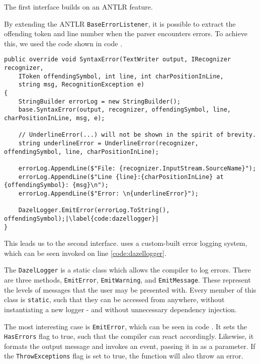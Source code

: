 The first interface builds on an ANTLR feature. 

By extending the ANTLR \texttt{BaseErrorListener}, it is possible to extract the offending token and line number when the parser encounters errors. To achieve this, we used the code shown in code .

\begin{lstlisting}[language=CSharp, caption={The altered \texttt{SyntaxError} method.}, label={lst:SyntaxErrorCode}, escapechar=|]
public override void SyntaxError(TextWriter output, IRecognizer recognizer, 
    IToken offendingSymbol, int line, int charPositionInLine,
    string msg, RecognitionException e)
{
    StringBuilder errorLog = new StringBuilder();
    base.SyntaxError(output, recognizer, offendingSymbol, line, charPositionInLine, msg, e);
    
    // UnderlineError(...) will not be shown in the spirit of brevity.
    string underlineError = UnderlineError(recognizer, offendingSymbol, line, charPositionInLine);

    errorLog.AppendLine($"File: {recognizer.InputStream.SourceName}");
    errorLog.AppendLine($"Line {line}:{charPositionInLine} at {offendingSymbol}: {msg}\n");
    errorLog.AppendLine($"Error: \n{underlineError}");

    DazelLogger.EmitError(errorLog.ToString(), offendingSymbol);|\label{code:dazellogger}|
}
\end{lstlisting}

This leads us to the second interface. \dazel{} uses a custom-built error logging system, which can be seen invoked on line \ref{code:dazellogger}.

The \texttt{DazelLogger} is a static class which allows the \dazel{} compiler to log errors. There are three methods, \texttt{EmitError}, \texttt{EmitWarning}, and \texttt{EmitMessage}. These represent the levels of messages that the user may be presented with. Every member of this class is \texttt{static}, such that they can be accessed from anywhere, without instantiating a new logger - and without unnecessary dependency injection.

The most interesting case is \texttt{EmitError}, which can be seen in code . It sets the \texttt{HasErrors} flag to true, such that the \dazel{} compiler can react accordingly. Likewise, it formats the output message and invokes an event, passing it in as a parameter.
If the \texttt{ThrowExceptions} flag is set to true, the function will also throw an error.

